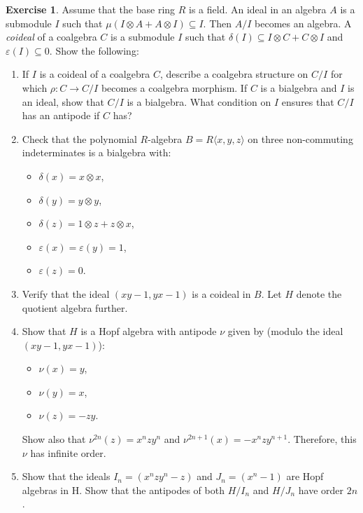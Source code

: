 \documentclass[8pt]{article}
\theoremstyle{definition}
\theoremstyle{definition}
\theoremstyle{definition}
\theoremstyle{definition}
\theoremstyle{definition}
\theoremstyle{definition}
\theoremstyle{definition}
\theoremstyle{definition}
\theoremstyle{definition}
\theoremstyle{definition}
\theoremstyle{definition}
\theoremstyle{definition}
\theoremstyle{definition}
\newtheorem{exercise}{Exercise}[section]
\theoremstyle{definition}
\theoremstyle{question}
\begin{document}
\begin{exercise}
  Assume that the base ring $R$ is a field. An ideal in an algebra $A$ is a submodule $I$ such that 
  $\mu(I \otimes A + A \otimes I) \subseteq I$. Then $A/I$ becomes an algebra. A \emph{coideal} of a coalgebra $C$
  is a submodule $I$ such that $\delta(I) \subseteq I \otimes C + C \otimes I$ and $\varepsilon(I) \subseteq 0$.
  Show the following:
  \begin{enumerate}
    \item If $I$ is a coideal of a coalgebra $C$, describe a coalgebra structure on $C/I$ for which 
    $\rho : C \to C / I$ becomes a coalgebra morphism. If $C$ is a bialgebra and $I$ is an ideal, show that $C/I$
    is a bialgebra. What condition on $I$ ensures that $C/I$ has an antipode if $C$ has?
    \item Check that the polynomial $R$-algebra $B = R\langle x, y, z \rangle$ on three non-commuting indeterminates
    is a bialgebra with:
    \begin{itemize}
      \item $\delta(x) = x \otimes x$,
      \item $\delta(y) = y \otimes y$,
      \item $\delta(z) = 1 \otimes z + z \otimes x$,
      \item $\varepsilon(x) = \varepsilon(y) = 1$,
      \item $\varepsilon(z) = 0$.
    \end{itemize}
    \item Verify that the ideal $(xy - 1, yx - 1)$ is a coideal in $B$. Let $H$ denote the quotient algebra further.
    \item Show that $H$ is a Hopf algebra with antipode $\nu$ given by (modulo the ideal $(xy - 1, yx - 1)$):
    \begin{itemize}
      \item $\nu(x) = y$,
      \item $\nu(y) = x$, 
      \item $\nu(z) = - zy$.
    \end{itemize}
    Show also that $\nu^{2n}(z) = x^n z y^n$ and $\nu^{2n + 1}(x) = -x^n z y^{n + 1}$. Therefore, this $\nu$
    has infinite order.
    \item Show that the ideals $I_n = (x^n z y^n - z)$ and $J_n = (x^n - 1)$ are Hopf algebras in H. Show that the antipodes
    of both $H/I_n$ and $H/J_n$ have order $2n$.
  \end{enumerate}
\end{exercise}
\end{document}
